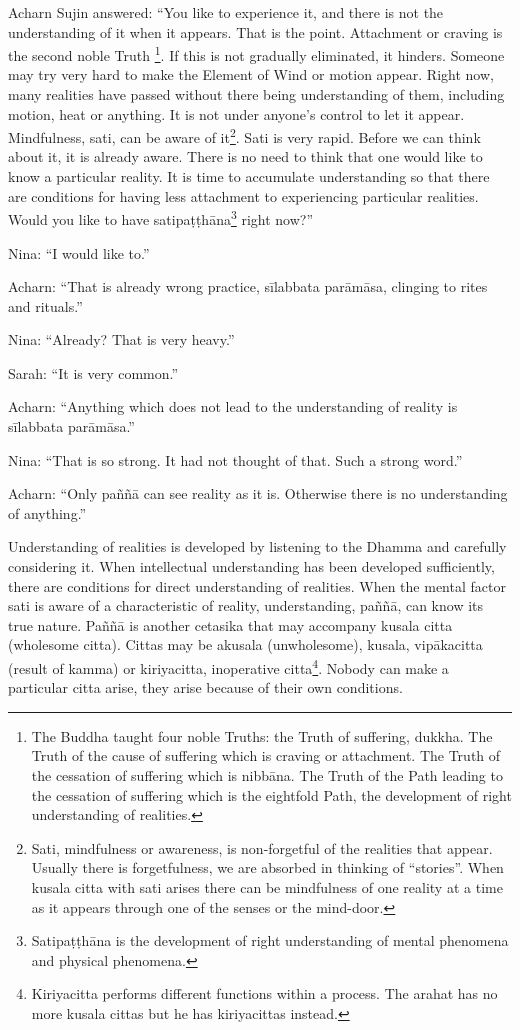 Acharn Sujin answered: ``You like to experience it, and there is not the
understanding of it when it appears. That is the point. Attachment or
craving is the second noble Truth
\footnote{The Buddha taught four
noble Truths: the Truth of suffering, dukkha. The Truth of the cause of
suffering which is craving or attachment. The Truth of the cessation of
suffering which is nibbāna. The Truth of the Path leading to the
cessation of suffering which is the eightfold Path, the development of
right understanding of realities.}. If this is not gradually
eliminated, it hinders. Someone may try very hard to make the Element of
Wind or motion appear. Right now, many realities have passed without
there being understanding of them, including motion, heat or anything.
It is not under anyone's control to let it appear. Mindfulness, sati,
can be aware of it\footnote{Sati, mindfulness or
awareness, is non-forgetful of the realities that appear. Usually there
is forgetfulness, we are absorbed in thinking of ``stories''. When
kusala citta with sati arises there can be mindfulness of one reality at
a time as it appears through one of the senses or the mind-door.}. Sati
is very rapid. Before we can think about it, it is already aware. There
is no need to think that one would like to know a particular reality. It
is time to accumulate understanding so that there are conditions for
having less attachment to experiencing particular realities. Would you
like to have satipaṭṭhāna\footnote{Satipaṭṭhāna is the
development of right understanding of mental phenomena and physical
phenomena.}
right now?''

Nina: ``I would like to.''

Acharn: ``That is already wrong practice, sīlabbata parāmāsa, clinging
to rites and rituals.''

Nina: ``Already? That is very heavy.''

Sarah: ``It is very common.''

Acharn: ``Anything which does not lead to the understanding of reality
is sīlabbata parāmāsa.''

Nina: ``That is so strong. It had not thought of that. Such a strong
word.''

Acharn: ``Only paññā can see reality as it is. Otherwise there is no
understanding of anything.''

Understanding of realities is developed by listening to the Dhamma and
carefully considering it. When intellectual understanding has been
developed sufficiently, there are conditions for direct understanding of
realities. When the mental factor sati is aware of a characteristic of
reality, understanding, paññā, can know its true nature. Paññā is
another cetasika that may accompany kusala citta (wholesome citta).
Cittas may be akusala (unwholesome), kusala, vipākacitta (result of
kamma) or kiriyacitta, inoperative citta\footnote{Kiriyacitta performs
different functions within a process. The arahat has no more kusala
cittas but he has kiriyacittas instead.}. Nobody can make a
particular citta arise, they arise because of their own conditions. 

